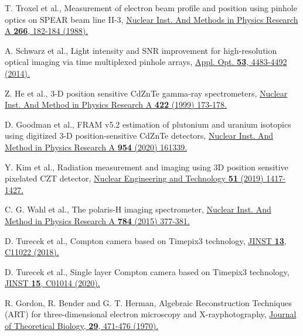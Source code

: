 \documentclass[a4paper,11pt]{article}
\begin{document}
\begin{thebibliography}{90}
 T. Troxel et al., Measurement of electron beam profile and position using pinhole optics on SPEAR beam line II-3, \href{https://www.sciencedirect.com/science/article/pii/0168900288903798}{\color {blue} Nuclear Inst. And Methods in Physics Research A {\bf 266}, 182-184 (1988).}

 A. Schwarz et al., Light intensity and SNR improvement for high-resolution optical imaging via time multiplexed pinhole arrays, \href{https://doi.org/10.1364/AO.53.004483}{\color {blue}  Appl. Opt. {\bf 53}, 4483-4492 (2014).}




 Z. He et al., 3-D position sensitive CdZnTe gamma-ray spectrometers, \href{https://www.sciencedirect.com/science/article/pii/S0168900298009504}{\color {blue}Nuclear Inst. And Method in Physics Research A {\bf 422} (1999) 173-178.}

 D. Goodman et al., FRAM v5.2 estimation of plutonium and uranium isotopics using digitized 3-D position-sensitive CdZnTe detectors, \href{https://www.sciencedirect.com/science/article/pii/S0168900218313329}{\color {blue}Nuclear Inst. And Method in Physics Research A {\bf 954} (2020) 161339.}

 Y. Kim et al., Radiation measurement and imaging using 3D position sensitive pixelated CZT detector, \href{https://www.sciencedirect.com/science/article/pii/S1738573318305461}{\color {blue}Nuclear Engineering and Technology {\bf51} (2019) 1417-1427.}

C. G. Wahl et al., The polaris-H imaging spectrometer, \href{https://www.sciencedirect.com/science/article/pii/S0168900215000121}{\color {blue}Nuclear Inst. And Method in Physics Research A {\bf 784} (2015) 377-381.}

 D. Turecek et al., Compton camera based on Timepix3 technology, \href{https://iopscience.iop.org/article/10.1088/1748-0221/13/11/C11022}{\color {blue} JINST {\bf 13}, C11022 (2018).}

 D. Turecek et al., Single layer Compton camera based on Timepix3 technology, \href{https://iopscience.iop.org/article/10.1088/1748-0221/15/01/C01014}{\color {blue}JINST {\bf 15}, C01014 (2020).}


 R. Gordon, R. Bender and G. T. Herman, Algebraic Reconstruction Techniques (ART) for three-dimensional electron microscopy and X-rayphotography, \href{https://www.sciencedirect.com/science/article/abs/pii/0022519370901098}{ \color {blue}Journal of Theoretical Biology, {\bf 29}, 471-476 (1970).}





\end{thebibliography}
\end{document}
